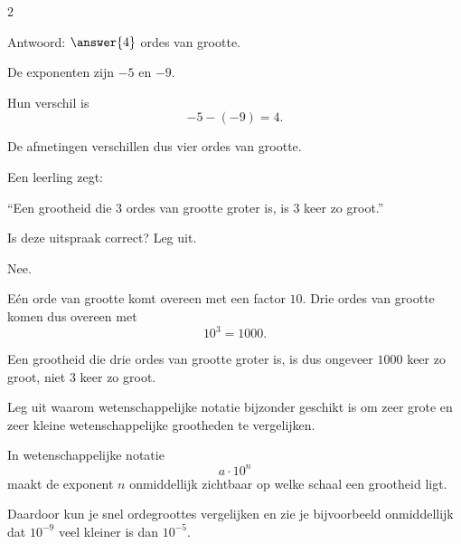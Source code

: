 \documentclass{ximera}
\begin{document}
\begin{oefening}{\oefU}
\begin{multicols}{2}
\begin{question}
                Antwoord: $\answer{4}$ ordes van grootte.
                
                \begin{oplossing}
                De exponenten zijn $-5$ en $-9$.
                
                Hun verschil is
                \[
                -5-(-9)=4.
                \]
                
                De afmetingen verschillen dus vier ordes van grootte.
                \end{oplossing}
                \end{question}
                
                
                \begin{question}
                Een leerling zegt:
                
                ``Een grootheid die $3$ ordes van grootte groter is, is $3$ keer zo groot.''
                
                Is deze uitspraak correct? Leg uit.
                
                \begin{oplossing}
                Nee.
                
                Eén orde van grootte komt overeen met een factor $10$.
                Drie ordes van grootte komen dus overeen met
                \[
                10^3=1000.
                \]
                
                Een grootheid die drie ordes van grootte groter is, is dus ongeveer
                $1000$ keer zo groot, niet $3$ keer zo groot.
                \end{oplossing}
                \end{question}
                
                
                \begin{question}
                Leg uit waarom wetenschappelijke notatie bijzonder geschikt is om
                zeer grote en zeer kleine wetenschappelijke grootheden te vergelijken.
                
                \begin{oplossing}
                In wetenschappelijke notatie
                \[
                a\cdot10^n
                \]
                maakt de exponent $n$ onmiddellijk zichtbaar op welke schaal een
                grootheid ligt.
                
                Daardoor kun je snel ordegroottes vergelijken en zie je bijvoorbeeld
                onmiddellijk dat $10^{-9}$ veel kleiner is dan $10^{-5}$.
                

\end{oplossing}
\end{question}
\end{multicols}
\end{oefening}
\end{document}
